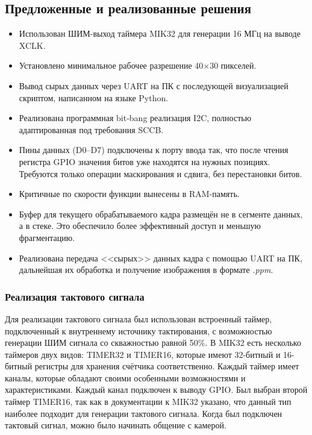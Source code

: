 \documentclass[a4paper]{article}
\begin{document}
\subsection{Предложенные и реализованные решения}
    \begin{itemize}
        \item Использован ШИМ-выход таймера MIK32 для генерации 16 МГц на выводе XCLK.
        \item Установлено минимальное рабочее разрешение 40×30 пикселей.
        \item Вывод сырых данных через UART на ПК с последующей визуализацией скриптом, написанном на языке Python.
        \item Реализована программная bit‑bang реализация I2C, полностью адаптированная под требования SCCB.
        \item Пины данных (D0–D7) подключены к порту ввода так, что после чтения регистра GPIO значения битов уже находятся на нужных позициях. Требуются только операции маскирования и сдвига, без перестановки битов.
        \item Критичные по скорости функции вынесены в RAM-память.
        \item Буфер для текущего обрабатываемого кадра размещён не в сегменте данных, а в стеке. Это обеспечило более эффективный доступ и меньшую фрагментацию.  
        \item Реализована передача <<сырых>> данных кадра с помощью UART на ПК, дальнейшая их обработка и получение изображения в формате \textit{.ppm}.
    \end{itemize}

    \subsubsection{Реализация тактового сигнала}
    Для реализации тактового сигнала был использован встроенный таймер, подключенный к внутреннему источнику тактирования, с возможностью генерации ШИМ сигнала со скважностью равной 50\%.
    В MIK32 есть несколько таймеров двух видов: TIMER32 и TIMER16, которые имеют 32-битный и 16-битный регистры для хранения счётчика соответственно.
    Каждый таймер имеет каналы, которые обладают своими особенными возможностями и характеристиками.
    Каждый канал подключен к выводу GPIO.
    Был выбран второй таймер TIMER16, так как в документации к MIK32 указано, что данный тип наиболее подходит для генерации тактового сигнала.
    Когда был подключен тактовый сигнал, можно было начинать общение с камерой.
\end{document}
